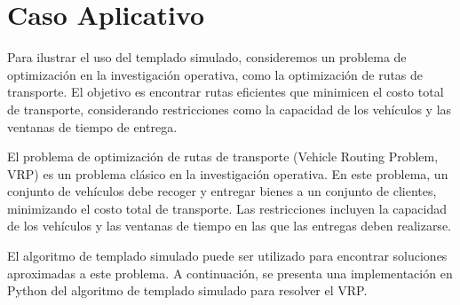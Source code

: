 \documentclass{article}
\begin{document}
\section{Caso Aplicativo}
Para ilustrar el uso del templado simulado, consideremos un problema de optimización en la investigación operativa, como la optimización de rutas de transporte. El objetivo es encontrar rutas eficientes que minimicen el costo total de transporte, considerando restricciones como la capacidad de los vehículos y las ventanas de tiempo de entrega.

El problema de optimización de rutas de transporte (Vehicle Routing Problem, VRP) es un problema clásico en la investigación operativa. En este problema, un conjunto de vehículos debe recoger y entregar bienes a un conjunto de clientes, minimizando el costo total de transporte. Las restricciones incluyen la capacidad de los vehículos y las ventanas de tiempo en las que las entregas deben realizarse.

El algoritmo de templado simulado puede ser utilizado para encontrar soluciones aproximadas a este problema. A continuación, se presenta una implementación en Python del algoritmo de templado simulado para resolver el VRP.

\end{document}
